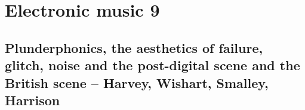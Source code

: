 
\chapter{Electronic music 9}
\label{history9}

\section{Plunderphonics, the aesthetics of failure, glitch, noise and the post-digital scene and the British scene – Harvey, Wishart, Smalley, Harrison}




